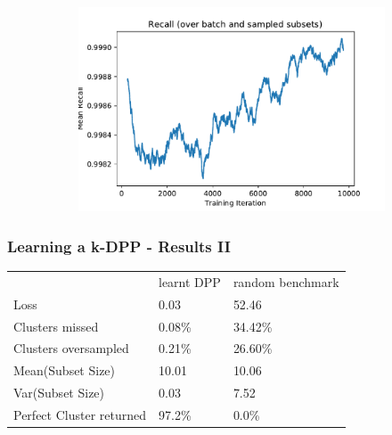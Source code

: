 \documentclass[aspectratio=43]{beamer}
\begin{document}
\begin{frame}
\begin{figure}[ht]
\begin{subfigure}[b]{0.5\linewidth}
    \label{fig7:c} 
  \end{subfigure}%
  \begin{subfigure}[b]{0.5\linewidth}
    \centering
    \includegraphics[width=0.9\linewidth]{plots/rec_kDPP.pdf} 
    \label{fig7:d} 
  \end{subfigure} 
  \label{fig7} 
\end{figure}
\end{frame}

\begin{frame}
\frametitle{Learning a k-DPP - Results II}
\begin{table}[]
\centering
\label{my-label}
\begin{tabular}{lll}
                         & learnt DPP  & random benchmark \\
Loss                 & 0.03   & 52.46            \\
Clusters missed          & 0.08\% & 34.42\%          \\
Clusters oversampled     & 0.21\% & 26.60\%          \\
Mean(Subset Size)        & 10.01  & 10.06            \\
Var(Subset Size)         & 0.03   & 7.52             \\
Perfect Cluster returned & 97.2\% & 0.0\%           
\end{tabular}
\end{table}
\end{frame}
\end{document}
